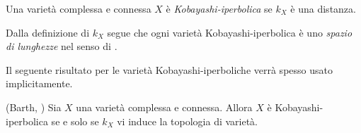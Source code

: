 \begin{defn}
    Una varietà complessa e connessa $X$ è \textit{Kobayashi-iperbolica} se $k_X$ è una distanza.
\end{defn}

\begin{oss} \label{lengthspace}
    Dalla definizione di $k_X$ segue che ogni varietà Kobayashi-iperbolica è uno \textit{spazio di lunghezze} nel senso di \cite[Part I, Definition 3.1]{BH}.
\end{oss}

Il seguente risultato per le varietà Kobayashi-iperboliche verrà spesso usato implicitamente.

\begin{prop}
    (Barth, \cite{B}) Sia $X$ una varietà complessa e connessa. Allora $X$ è Kobayashi-iperbolica se e solo se $k_X$ vi induce la topologia di varietà.
\end{prop}
